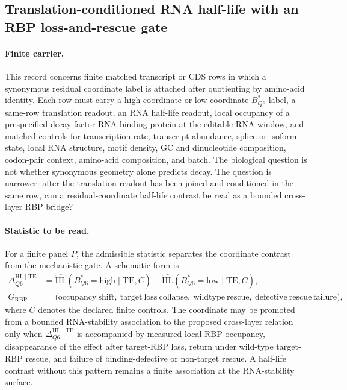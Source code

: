 \subsection{Translation-conditioned RNA half-life with an RBP loss-and-rescue gate}
\label{subsec:q6-translation-conditioned-rna-half-life-rbp-bridge-cross-layer}

\paragraph{Finite carrier.}
This record concerns finite matched transcript or CDS rows in which a synonymous residual coordinate label is attached after quotienting by amino-acid identity. Each row must carry a high-coordinate or low-coordinate $B^{*}_{Q6}$ label, a same-row translation readout, an RNA half-life readout, local occupancy of a prespecified decay-factor RNA-binding protein at the editable RNA window, and matched controls for transcription rate, transcript abundance, splice or isoform state, local RNA structure, motif density, GC and dinucleotide composition, codon-pair context, amino-acid composition, and batch. The biological question is not whether synonymous geometry alone predicts decay. The question is narrower: after the translation readout has been joined and conditioned in the same row, can a residual-coordinate half-life contrast be read as a bounded cross-layer RBP bridge?

\paragraph{Statistic to be read.}
For a finite panel $P$, the admissible statistic separates the coordinate contrast from the mechanistic gate. A schematic form is
$$
\begin{aligned}
\Delta_{Q6}^{\mathrm{HL}\mid\mathrm{TE}}
  &= \widehat{\mathrm{HL}}(B^{*}_{Q6}=\mathrm{high}\mid \mathrm{TE}, C)
   - \widehat{\mathrm{HL}}(B^{*}_{Q6}=\mathrm{low}\mid \mathrm{TE}, C), \\
G_{\mathrm{RBP}}
  &= \bigl(\mathrm{occupancy\ shift},\ \mathrm{target\ loss\ collapse},\ \mathrm{wildtype\ rescue},\ \mathrm{defective\ rescue\ failure}\bigr),
\end{aligned}
$$
where $C$ denotes the declared finite controls. The coordinate may be promoted from a bounded RNA-stability association to the proposed cross-layer relation only when $\Delta_{Q6}^{\mathrm{HL}\mid\mathrm{TE}}$ is accompanied by measured local RBP occupancy, disappearance of the effect after target-RBP loss, return under wild-type target-RBP rescue, and failure of binding-defective or non-target rescue. A half-life contrast without this pattern remains a finite association at the RNA-stability surface.

